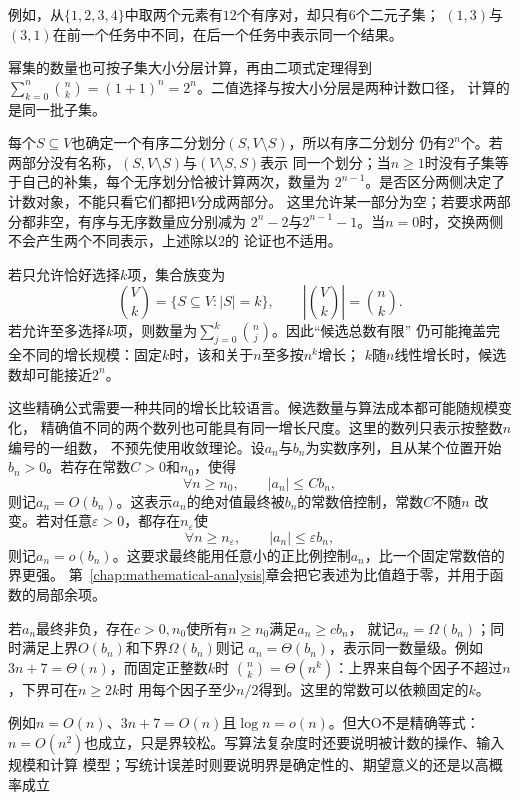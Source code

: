 例如，从$\{1,2,3,4\}$中取两个元素有$12$个有序对，却只有$6$个二元子集；
$(1,3)$与$(3,1)$在前一个任务中不同，在后一个任务中表示同一个结果。

幂集的数量也可按子集大小分层计算，再由二项式定理得到
$\sum_{k=0}^{n}\binom{n}{k}=(1+1)^n=2^n$。二值选择与按大小分层是两种计数口径，
计算的是同一批子集。

每个$S\subseteq V$也确定一个有序二分划分$(S,V\setminus S)$，所以有序二分划分
仍有$2^n$个。若两部分没有名称，$(S,V\setminus S)$与$(V\setminus S,S)$表示
同一个划分；当$n\geq1$时没有子集等于自己的补集，每个无序划分恰被计算两次，数量为
$2^{n-1}$。是否区分两侧决定了计数对象，不能只看它们都把$V$分成两部分。
这里允许某一部分为空；若要求两部分都非空，有序与无序数量应分别减为
$2^n-2$与$2^{n-1}-1$。当$n=0$时，交换两侧不会产生两个不同表示，上述除以$2$的
论证也不适用。

若只允许恰好选择$k$项，集合族变为
\[
  \binom{V}{k}=\{S\subseteq V:|S|=k\},
  \qquad
  \left|\binom{V}{k}\right|=\binom{n}{k}.
\]
若允许至多选择$k$项，则数量为$\sum_{j=0}^{k}\binom{n}{j}$。因此“候选总数有限”
仍可能掩盖完全不同的增长规模：固定$k$时，该和关于$n$至多按$n^k$增长；
$k$随$n$线性增长时，候选数却可能接近$2^n$。

这些精确公式需要一种共同的增长比较语言。候选数量与算法成本都可能随规模变化，
精确值不同的两个数列也可能具有同一增长尺度。这里的数列只表示按整数$n$编号的一组数，
不预先使用收敛理论。设$a_n$与$b_n$为实数序列，且从某个位置开始
$b_n>0$。若存在常数$C>0$和$n_0$，使得
\[
  \forall n\geq n_0,\qquad |a_n|\leq Cb_n,
\]
则记$a_n=O(b_n)$。这表示$a_n$的绝对值最终被$b_n$的常数倍控制，常数$C$不随$n$
改变。若对任意$\varepsilon>0$，都存在$n_\varepsilon$使
\[
  \forall n\geq n_\varepsilon,\qquad |a_n|\leq\varepsilon b_n,
\]
则记$a_n=o(b_n)$。这要求最终能用任意小的正比例控制$a_n$，比一个固定常数倍的界更强。
第~\ref{chap:mathematical-analysis}章会把它表述为比值趋于零，并用于函数的局部余项。

若$a_n$最终非负，存在$c>0,n_0$使所有$n\geq n_0$满足$a_n\geq cb_n$，
就记$a_n=\Omega(b_n)$；同时满足上界$O(b_n)$和下界$\Omega(b_n)$则记
$a_n=\Theta(b_n)$，表示同一数量级。例如$3n+7=\Theta(n)$，而固定正整数$k$时
$\binom nk=\Theta(n^k)$：上界来自每个因子不超过$n$，下界可在$n\geq2k$时
用每个因子至少$n/2$得到。这里的常数可以依赖固定的$k$。

例如$n=O(n)$、$3n+7=O(n)$且$\log n=o(n)$。但大O不是精确等式：
$n=O(n^2)$也成立，只是界较松。写算法复杂度时还要说明被计数的操作、输入规模和计算
模型；写统计误差时则要说明界是确定性的、期望意义的还是以高概率成立

